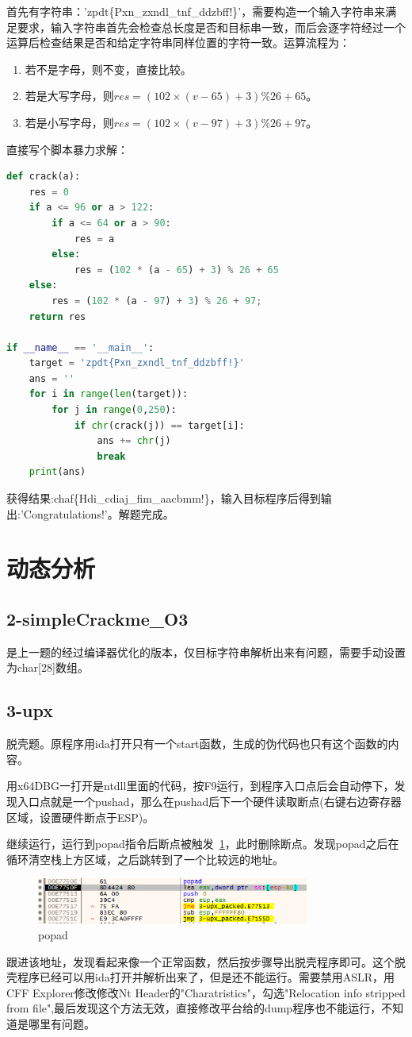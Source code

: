 首先有字符串：'zpdt\{Pxn\_zxndl\_tnf\_ddzbff!\}'，需要构造一个输入字符串来满足要求，输入字符串首先会检查总长度是否和目标串一致，而后会逐字符经过一个运算后检查结果是否和给定字符串同样位置的字符一致。运算流程为：
\begin{enumerate}
    \item 若不是字母，则不变，直接比较。
    \item 若是大写字母，则$res = (102 \times (v - 65) + 3) \%26 + 65$。
    \item 若是小写字母，则$res = (102 \times (v - 97) + 3) \%26 + 97$。
\end{enumerate}
直接写个脚本暴力求解：
\begin{lstlisting}[language=python]
def crack(a):
    res = 0
    if a <= 96 or a > 122:
        if a <= 64 or a > 90:
            res = a
        else:
            res = (102 * (a - 65) + 3) % 26 + 65
    else:
        res = (102 * (a - 97) + 3) % 26 + 97;
    return res

if __name__ == '__main__':
    target = 'zpdt{Pxn_zxndl_tnf_ddzbff!}'
    ans = ''
    for i in range(len(target)):
        for j in range(0,250):
            if chr(crack(j)) == target[i]:
                ans += chr(j)
                break
    print(ans)
\end{lstlisting}
获得结果:chaf\{Hdi\_cdiaj\_fim\_aacbmm!\}，输入目标程序后得到输出:'Congratulations!'。解题完成。

\section{动态分析}

\subsection{2-simpleCrackme\_O3}
是上一题的经过编译器优化的版本，仅目标字符串解析出来有问题，需要手动设置为char[28]数组。

\subsection{3-upx}
脱壳题。原程序用ida打开只有一个start函数，生成的伪代码也只有这个函数的内容。

用x64DBG一打开是ntdll里面的代码，按F9运行，到程序入口点后会自动停下，发现入口点就是一个pushad，那么在pushad后下一个硬件读取断点(右键右边寄存器区域，设置硬件断点于ESP)。

继续运行，运行到popad指令后断点被触发~\ref{fig:5_pic1}，此时删除断点。发现popad之后在循环清空栈上方区域，之后跳转到了一个比较远的地址。
\begin{figure}[H]
    \centering
    \includegraphics[width=0.8\textwidth]{5-reverse_engineering/pic/1.jpg}
    \caption{popad}
    \label{fig:5_pic1}
\end{figure}

跟进该地址，发现看起来像一个正常函数，然后按步骤导出脱壳程序即可。这个脱壳程序已经可以用ida打开并解析出来了，但是还不能运行。需要禁用ASLR，用CFF Explorer修改修改Nt Header的"Charatristics"，勾选"Relocation info stripped from file",最后发现这个方法无效，直接修改平台给的dump程序也不能运行，不知道是哪里有问题。